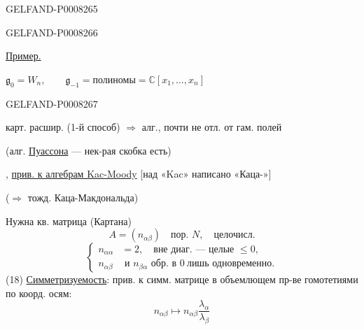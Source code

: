 \begin{GelfandAdjacentEvidence}{GELFAND-P000826}{5}


\end{GelfandAdjacentEvidence}
\begin{GelfandAdjacentEvidence}{GELFAND-P000826}{6}


\uline{Пример.}

\(\mathfrak g_0=W_n,\qquad
\mathfrak g_{-1}=\text{полиномы}=\mathbb{C}[x_1,\ldots,x_n]\)
\end{GelfandAdjacentEvidence}
\begin{GelfandAdjacentEvidence}{GELFAND-P000826}{7}


карт. расшир. (1-й способ) \(\Rightarrow\) алг., почти не отл. от гам. полей

(алг. \uline{Пуассона} — нек-рая скобка есть)

\end{GelfandAdjacentEvidence}


, \uline{прив. к алгебрам Kac-Moody} [над «Kac» написано «Каца-»]

(\(\Rightarrow\) тожд. Каца-Макдональда)

Нужна кв. матрица (Картана)
\begin{equation*}
A=(n_{\alpha\beta})\quad\text{пор. }N,\quad\text{целочисл.}\tag{16}
\end{equation*}
\begin{equation*}
\left\{\begin{aligned}
n_{\alpha\alpha}&=2,\quad\text{вне диаг. — целые }\le0,\\
n_{\alpha\beta}&\text{ и }n_{\beta\alpha}\text{ обр. в }0\ \text{лишь одновременно}.
\end{aligned}\right.\tag{17}
\end{equation*}
(18) \uline{Симметризуемость}: прив. к симм. матрице в объемлющем пр-ве гомотетиями по коорд. осям:
\[
n_{\alpha\beta}\mapsto n_{\alpha\beta}\frac{\lambda_\alpha}{\lambda_\beta}
\]


